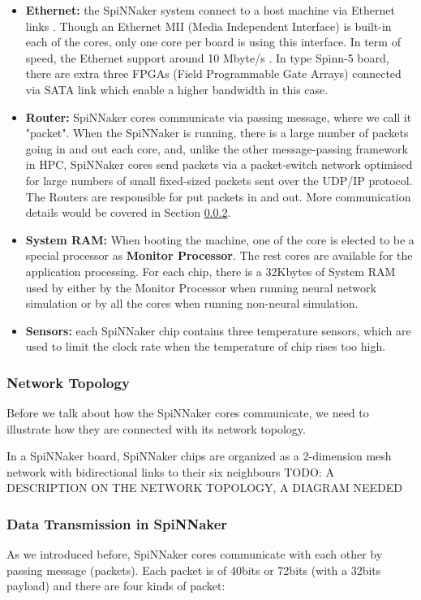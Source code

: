 \begin{itemize}
    \item \textbf{Ethernet:} the SpiNNaker system connect to a host machine via Ethernet links \cite{furber2012overview}. Though an Ethernet MII (Media Independent Interface) is built-in each of the cores, only one core per board is using this interface. In term of speed, the Ethernet support around 10 Mbyte/s \cite{spin-chip-resources}. In type Spinn-5 board, there are extra three FPGAs (Field Programmable Gate Arrays) connected via SATA link which enable a higher bandwidth in this case. 
    
    \item \textbf{Router\label{sec:router}:} SpiNNaker cores communicate via passing message, where we call it "packet". When the SpiNNaker is running, there is a large number of packets going in and out each core, and, unlike the other message-passing framework in HPC, SpiNNaker cores send packets via a packet-switch network optimised for large numbers of small fixed-sized packets sent over the UDP/IP protocol. The Routers are responsible for put packets in and out. More communication details would be covered in Section \ref{sec:dt}.
    
    \item \textbf{System RAM:} When booting the machine, one of the core is elected to be a special processor as \textbf{Monitor Processor}. The rest cores are available for the application processing. For each chip, there is a 32Kbytes of System RAM used by either by the Monitor Processor when running neural network simulation or by all the cores when running non-neural simulation.
    
    \item \textbf{Sensors:} each SpiNNaker chip contains three temperature sensors, which are used to limit the clock rate when the temperature of chip rises too high.
\end{itemize}
\subsubsection{Network Topology}
Before we talk about how the SpiNNaker cores communicate, we need to illustrate how they are connected with its network topology.

In a SpiNNaker board, SpiNNaker chips are organized as a 2-dimension mesh network with bidirectional links to their six neighbours \cite{testchip} TODO: A DESCRIPTION ON THE NETWORK TOPOLOGY, A DIAGRAM NEEDED

\subsubsection{Data Transmission in SpiNNaker} \label{sec:dt}
As we introduced before, SpiNNaker cores communicate with each other by passing message (packets). Each packet is of 40bits or 72bits (with a 32bits payload) \cite{furber2012overview} and there are four kinds\cite{ws6} of packet:

